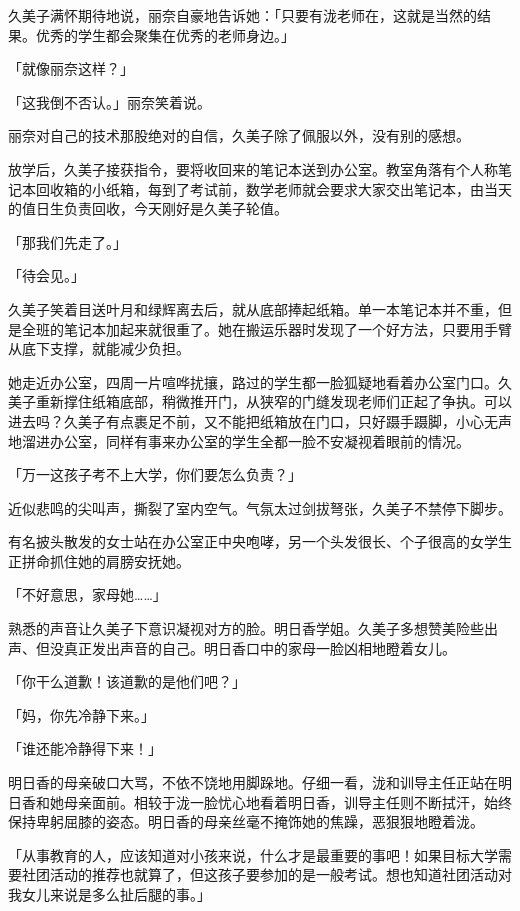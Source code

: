 \documentclass[UTF8]{ctexart}
\begin{document}
    久美子满怀期待地说，丽奈自豪地告诉她：「只要有泷老师在，这就是当然的结果。优秀的学生都会聚集在优秀的老师身边。」 

    「就像丽奈这样？」 

    「这我倒不否认。」丽奈笑着说。 

    丽奈对自己的技术那股绝对的自信，久美子除了佩服以外，没有别的感想。 

    放学后，久美子接获指令，要将收回来的笔记本送到办公室。教室角落有个人称笔记本回收箱的小纸箱，每到了考试前，数学老师就会要求大家交出笔记本，由当天的值日生负责回收，今天刚好是久美子轮值。 

    「那我们先走了。」 

    「待会见。」 

    久美子笑着目送叶月和绿辉离去后，就从底部捧起纸箱。单一本笔记本并不重，但是全班的笔记本加起来就很重了。她在搬运乐器时发现了一个好方法，只要用手臂从底下支撑，就能减少负担。 

    她走近办公室，四周一片喧哗扰攘，路过的学生都一脸狐疑地看着办公室门口。久美子重新撑住纸箱底部，稍微推开门，从狭窄的门缝发现老师们正起了争执。可以进去吗？久美子有点裹足不前，又不能把纸箱放在门口，只好蹑手蹑脚，小心无声地溜进办公室，同样有事来办公室的学生全都一脸不安凝视着眼前的情况。 

    「万一这孩子考不上大学，你们要怎么负责？」 

    近似悲鸣的尖叫声，撕裂了室内空气。气氛太过剑拔弩张，久美子不禁停下脚步。 

    有名披头散发的女士站在办公室正中央咆哮，另一个头发很长、个子很高的女学生正拼命抓住她的肩膀安抚她。 

    「不好意思，家母她……」 

    熟悉的声音让久美子下意识凝视对方的脸。明日香学姐。久美子多想赞美险些出声、但没真正发出声音的自己。明日香口中的家母一脸凶相地瞪着女儿。 

    「你干么道歉！该道歉的是他们吧？」 

    「妈，你先冷静下来。」 

    「谁还能冷静得下来！」 

    明日香的母亲破口大骂，不依不饶地用脚跺地。仔细一看，泷和训导主任正站在明日香和她母亲面前。相较于泷一脸忧心地看着明日香，训导主任则不断拭汗，始终保持卑躬屈膝的姿态。明日香的母亲丝毫不掩饰她的焦躁，恶狠狠地瞪着泷。 

    「从事教育的人，应该知道对小孩来说，什么才是最重要的事吧！如果目标大学需要社团活动的推荐也就算了，但这孩子要参加的是一般考试。想也知道社团活动对我女儿来说是多么扯后腿的事。」 
\end{document}
